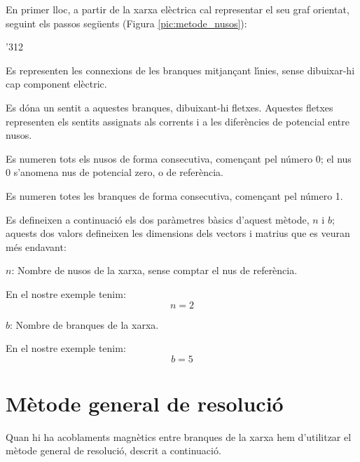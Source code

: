 En primer lloc, a partir de la xarxa el\`{e}ctrica
cal representar el seu graf orientat, seguint els passos seg\"{u}ents
(Figura \vref{pic:metode_nusos}):
\begin{dingautolist}{'312}
   \item Es representen les connexions de les branques mitjan\c{c}ant l\'{\i}nies, sense dibuixar-hi cap component el\`{e}ctric.
   \item Es d\'{o}na un sentit a aquestes branques, dibuixant-hi fletxes. Aquestes fletxes representen els sentits assignats als corrents i a les difer\`{e}ncies de potencial entre nusos.
   \item Es numeren tots els nusos de forma consecutiva, comen\c{c}ant pel n\'{u}mero 0; el nus 0 s'anomena nus de potencial zero, o de refer\`{e}ncia.
   \item Es numeren totes les branques de forma consecutiva, comen\c{c}ant pel n\'{u}mero 1.
\end{dingautolist}

Es defineixen a continuaci\'{o} els dos
par\`{a}metres b\`{a}sics d'aquest m\`{e}tode, $n$ i $b$; aquests dos valors
defineixen les dimensions dels vectors i matrius que es veuran m\'{e}s
endavant:
\begin{list}{}
   {\setlength{\labelwidth}{7mm} \setlength{\leftmargin}{9mm} \setlength{\labelsep}{2mm}}
   \item[$n$:] Nombre de nusos de la xarxa, sense comptar el nus de refer\`{e}ncia.

   En el nostre exemple tenim:
   \[ n=2 \]

   \item[$b$:] Nombre de branques de la xarxa.

   En el nostre exemple tenim:
   \[ b=5 \]
\end{list}

\section{M\`{e}tode general de resoluci\'{o}}

Quan hi ha acoblaments
magn\`{e}tics entre branques de la xarxa hem d'utilitzar el m\`{e}tode
general de resoluci\'{o}, descrit a continuaci\'{o}.

